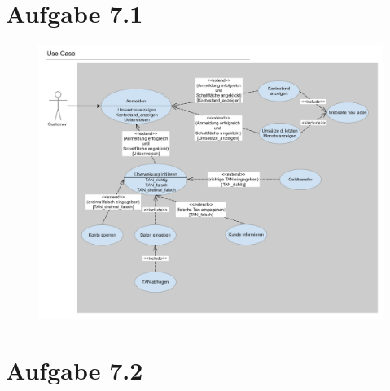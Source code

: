 \documentclass{scrartcl}
\begin{document}
	
	
	
	\section*{Aufgabe 7.1}
	 \begin{figure}[h!]
	 	\includegraphics[scale=0.18]{aufgabe_7_1.jpg}
	 \end{figure}
	\pagebreak
	
	\section*{Aufgabe 7.2}
	
\end{document}

